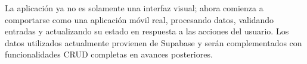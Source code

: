 La aplicaci\'on ya no es solamente una interfaz visual; ahora comienza a
comportarse como una aplicaci\'on m\'ovil real, procesando datos, validando
entradas y actualizando su estado en respuesta a las acciones del usuario.
Los datos utilizados actualmente provienen de Supabase y ser\'an
complementados con funcionalidades CRUD completas en avances posteriores.
